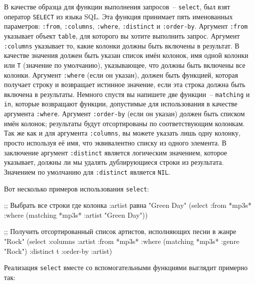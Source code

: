 В качестве образца для функции выполнения запросов~-- \lstinline{select}, был взят оператор
\lstinline{SELECT} из языка SQL. Эта функция принимает пять именованных параметров:
\lstinline{:from}, \lstinline{:columns}, \lstinline{:where}, \lstinline{:distinct} и \lstinline{:order-by}.
Аргумент \lstinline{:from} указывает объект \lstinline{table}, для которого вы хотите выполнить
запрос.  Аргумент \lstinline{:columns} указывает то, какие колонки должны быть включены в
результат.  В качестве значения должен быть указан список имён колонок, имя одной колонки
или \lstinline{T} (значение по умолчанию), указывающее, что должны быть включены все колонки.
Аргумент \lstinline{:where} (если он указан), должен быть функцией, которая получает строку и
возвращает истинное значение, если эта строка должна быть включена в результаты.  Немного
спустя вы напишете две функции~-- \lstinline{matching} и \lstinline{in}, которые возвращают
функции, допустимые для использования в качестве аргумента \lstinline{:where}.  Аргумент
\lstinline{:order-by} (если он указан) должен быть списком имён колонок; результаты будут
отсортированы по соответствующим колонкам.  Так же как и для аргумента \lstinline{:columns}, вы
можете указать лишь одну колонку, просто используя её имя, что эквивалентно списку из
одного элемента.  В заключение аргумент \lstinline{:distinct} является логическим значением,
которое указывает, должны ли мы удалять дублирующиеся строки из результата.  Значением
по умолчанию для \lstinline{:distinct} является \lstinline{NIL}.

Вот несколько примеров использования \lstinline{select}:

\begin{myverb}
;; Выбрать все строки где колонка :artist равна "Green Day"
(select :from *mp3s* :where (matching *mp3s* :artist "Green Day"))

;; Получить отсортированный список артистов, исполняющих песни в жанре "Rock"
(select
  :columns :artist
  :from *mp3s*
  :where (matching *mp3s* :genre "Rock")
  :distinct t
  :order-by :artist)
\end{myverb}

Реализация \lstinline{select} вместе со вспомогательными функциями выглядит примерно так:


